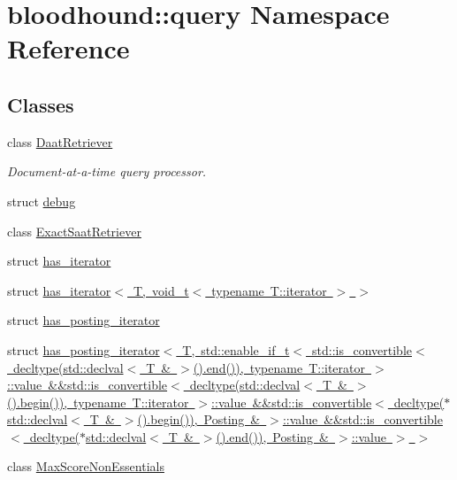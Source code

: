 \hypertarget{namespacebloodhound_1_1query}{}\section{bloodhound\+:\+:query Namespace Reference}
\label{namespacebloodhound_1_1query}
\subsection*{Classes}
\begin{DoxyCompactItemize}
\item 
class \mbox{\hyperlink{classbloodhound_1_1query_1_1DaatRetriever}{Daat\+Retriever}}
\begin{DoxyCompactList}\small\item\em Document-\/at-\/a-\/time query processor. \end{DoxyCompactList}\item 
struct \mbox{\hyperlink{structbloodhound_1_1query_1_1debug}{debug}}
\item 
class \mbox{\hyperlink{classbloodhound_1_1query_1_1ExactSaatRetriever}{Exact\+Saat\+Retriever}}
\item 
struct \mbox{\hyperlink{structbloodhound_1_1query_1_1has__iterator}{has\+\_\+iterator}}
\item 
struct \mbox{\hyperlink{structbloodhound_1_1query_1_1has__iterator_3_01T_00_01void__t_3_01typename_01T_1_1iterator_01_4_01_4}{has\+\_\+iterator$<$ T, void\+\_\+t$<$ typename T\+::iterator $>$ $>$}}
\item 
struct \mbox{\hyperlink{structbloodhound_1_1query_1_1has__posting__iterator}{has\+\_\+posting\+\_\+iterator}}
\item 
struct \mbox{\hyperlink{structbloodhound_1_1query_1_1has__posting__iterator_3_01T_00_01std_1_1enable__if__t_3_01std_1_1i3aad327a30d60305d06d5c73680c1a38}{has\+\_\+posting\+\_\+iterator$<$ T, std\+::enable\+\_\+if\+\_\+t$<$ std\+::is\+\_\+convertible$<$ decltype(std\+::declval$<$ T \& $>$().\+end()), typename T\+::iterator $>$\+::value \&\&std\+::is\+\_\+convertible$<$ decltype(std\+::declval$<$ T \& $>$().\+begin()), typename T\+::iterator $>$\+::value \&\&std\+::is\+\_\+convertible$<$ decltype($\ast$std\+::declval$<$ T \& $>$().\+begin()), Posting \& $>$\+::value \&\&std\+::is\+\_\+convertible$<$ decltype($\ast$std\+::declval$<$ T \& $>$().\+end()), Posting \& $>$\+::value $>$ $>$}}
\item 
class \mbox{\hyperlink{classbloodhound_1_1query_1_1MaxScoreNonEssentials}{Max\+Score\+Non\+Essentials}}

\end{DoxyCompactItemize}
